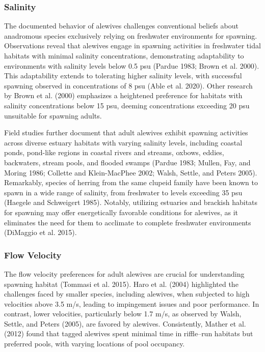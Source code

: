 \documentclass[
]{book}
\begin{document}
\hypertarget{salinity}{%
\subsubsection{Salinity}\label{salinity}}

The documented behavior of alewives challenges conventional beliefs about anadromous species exclusively relying on freshwater environments for spawning. Observations reveal that alewives engage in spawning activities in freshwater tidal habitats with minimal salinity concentrations, demonstrating adaptability to environments with salinity levels below 0.5 psu (Pardue 1983; Brown et al. 2000). This adaptability extends to tolerating higher salinity levels, with successful spawning observed in concentrations of 8 psu (Able et al. 2020). Other research by Brown et al. (2000) emphasizes a heightened preference for habitats with salinity concentrations below 15 psu, deeming concentrations exceeding 20 psu unsuitable for spawning adults.

Field studies further document that adult alewives exhibit spawning activities across diverse estuary habitats with varying salinity levels, including coastal ponds, pond-like regions in coastal rivers and streams, oxbows, eddies, backwaters, stream pools, and flooded swamps (Pardue 1983; Mullen, Fay, and Moring 1986; Collette and Klein-MacPhee 2002; Walsh, Settle, and Peters 2005). Remarkably, species of herring from the same clupeid family have been known to spawn in a wide range of salinity, from freshwater to levels exceeding 35 psu (Haegele and Schweigert 1985). Notably, utilizing estuaries and brackish habitats for spawning may offer energetically favorable conditions for alewives, as it eliminates the need for them to acclimate to complete freshwater environments (DiMaggio et al. 2015).

\hypertarget{flow-velocity}{%
\subsubsection{Flow Velocity}\label{flow-velocity}}

The flow velocity preferences for adult alewives are crucial for understanding spawning habitat (Tommasi et al. 2015). Haro et al. (2004) highlighted the challenges faced by smaller species, including alewives, when subjected to high velocities above 3.5 m/s, leading to impingement issues and poor performance. In contrast, lower velocities, particularly below 1.7 m/s, as observed by Walsh, Settle, and Peters (2005), are favored by alewives. Consistently, Mather et al. (2012) found that tagged alewives spent minimal time in riffle--run habitats but preferred pools, with varying locations of pool occupancy.
\end{document}
